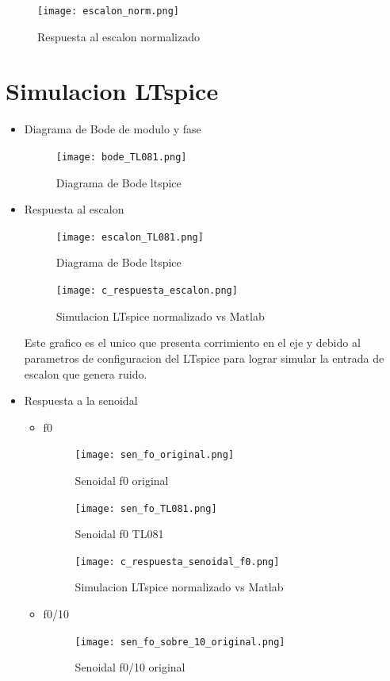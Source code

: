 \documentclass[11pt]{diazessay} %
\begin{document}
\begin{figure}[h]
\centering
	\texttt{[image: escalon\_norm.png]}
\caption{Respuesta al escalon normalizado}
\end{figure}

\newpage
\section*{Simulacion LTspice}
\begin{itemize}
\item Diagrama de Bode de modulo y fase
\begin{figure}[h]
\centering
	\texttt{[image: bode\_TL081.png]}
\caption{Diagrama de Bode ltspice}
\end{figure}

\newpage
\item Respuesta al escalon
\begin{figure}[h]
\centering
	\texttt{[image: escalon\_TL081.png]}
\caption{Diagrama de Bode ltspice}
\end{figure}

\newpage
\begin{figure}[h]
\centering
	\texttt{[image: c\_respuesta\_escalon.png]}
\caption{Simulacion LTspice normalizado vs Matlab}
\end{figure}
Este grafico es el unico que presenta corrimiento en el eje y debido al parametros de configuracion del LTspice para lograr simular la entrada de escalon que genera ruido. \\

\newpage
\item Respuesta a la senoidal
\begin{itemize}
\item f0
\begin{figure}[h]
\centering
	\texttt{[image: sen\_fo\_original.png]}
\caption{Senoidal f0 original}
\end{figure}

\begin{figure}[h]
\centering
	\texttt{[image: sen\_fo\_TL081.png]}
\caption{Senoidal f0 TL081}
\end{figure}

\newpage
\begin{figure}[h]
\centering
	\texttt{[image: c\_respuesta\_senoidal\_f0.png]}
\caption{Simulacion LTspice normalizado vs Matlab}
\end{figure}

\newpage
\item f0/10
\begin{figure}[h]
\centering
	\texttt{[image: sen\_fo\_sobre\_10\_original.png]}
\caption{Senoidal f0/10 original}
\end{figure}


\end{itemize}
\end{itemize}
\end{document}
